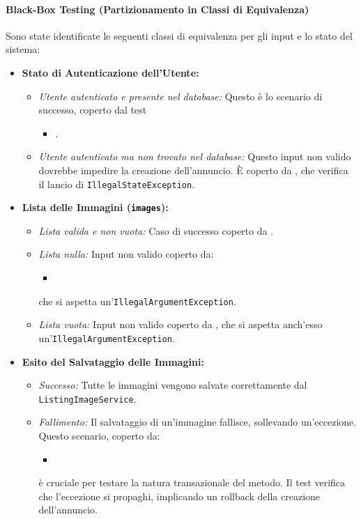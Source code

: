 \paragraph{Black-Box Testing (Partizionamento in Classi di Equivalenza)}
Sono state identificate le seguenti classi di equivalenza per gli input e lo stato del sistema:
\begin{itemize}
    \item \textbf{Stato di Autenticazione dell'Utente:}
    \begin{itemize}
        \item \textit{Utente autenticato e presente nel database:} Questo è lo scenario di successo, coperto dal test
        \begin{itemize}
        	\item {}.
        \end{itemize}
        \item \textit{Utente autenticato ma non trovato nel database:} Questo input non valido dovrebbe impedire la creazione dell'annuncio. È coperto da , che verifica il lancio di \texttt{IllegalStateException}.
    \end{itemize}
    \item \textbf{Lista delle Immagini (\texttt{images}):}
    \begin{itemize}
        \item \textit{Lista valida e non vuota:} Caso di successo coperto da .
        \item \textit{Lista nulla:} Input non valido coperto da:
        \begin{itemize}
        	\item {}
        \end{itemize} che si aspetta un'\texttt{IllegalArgumentException}.
        \item \textit{Lista vuota:} Input non valido coperto da , che si aspetta anch'esso un'\texttt{IllegalArgumentException}.
    \end{itemize}
    \item \textbf{Esito del Salvataggio delle Immagini:}
    \begin{itemize}
        \item \textit{Successo:} Tutte le immagini vengono salvate correttamente dal \texttt{ListingImageService}.
        \item \textit{Fallimento:} Il salvataggio di un'immagine fallisce, sollevando un'eccezione. Questo scenario, coperto da:
        \begin{itemize}
        	\item {}
        \end{itemize} è cruciale per testare la natura transazionale del metodo. Il test verifica che l'eccezione si propaghi, implicando un rollback della creazione dell'annuncio.
    \end{itemize}
\end{itemize}


